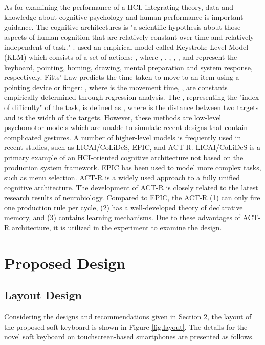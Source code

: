 \documentclass{singlecol-new}
\theoremstyle{TH}{
\newtheorem{lemma}{Lemma}
\newtheorem{theorem}[lemma]{Theorem}
\newtheorem{corrolary}[lemma]{Corrolary}
\newtheorem{conjecture}[lemma]{Conjecture}
\newtheorem{proposition}[lemma]{Proposition}
\newtheorem{claim}[lemma]{Claim}
\newtheorem{stheorem}[lemma]{Wrong Theorem}
\newtheorem{algorithm}{Algorithm}
}
\theoremstyle{THrm}{
\newtheorem{definition}{Definition}[section]
\newtheorem{question}{Question}[section]
\newtheorem{remark}{Remark}
\newtheorem{scheme}{Scheme}
}
\theoremstyle{THhit}{
\newtheorem{case}{Case}[section]
}
\begin{document}
As for examining the performance of a HCI, integrating theory, data and knowledge about cognitive psychology and human performance is important guidance. The cognitive architectures is "a scientific hypothesis about those aspects of human cognition that are relatively constant over time and relatively independent of task." \citep{gray1997introduction}. \citet{card1983psychology} used an empirical model called Keystroke-Level Model (KLM) which consists of a set of actions: , where , , , , , and  represent the keyboard, pointing, homing, drawing, mental preparation and system response, respectively. Fitts' Law \citep{fitts1954information} predicts the time taken to move to an item using a pointing device or finger: , where  is the movement time, ,  are constants empirically determined through regression analysis. The , representing the "index of difficulty" of the task, is defined as , where  is the distance between two targets and  is the width of the targets. However, these methods are low-level psychomotor models which are unable to simulate recent designs that contain complicated gestures. A number of higher-level models is frequently used in recent studies, such as LICAI/CoLiDeS, EPIC, and ACT-R. LICAI/CoLiDeS \citep{kitajima1997comprehension} is a primary example of an HCI-oriented cognitive architecture not based on the production system framework. EPIC \citep{kieras1997overview} has been used to model more complex tasks, such as menu selection. ACT-R \citep{anderson2004integrated}is a widely used approach to a fully unified cognitive architecture. The development of ACT-R is closely related to the latest research results of neurobiology. Compared to EPIC, the ACT-R (1) can only fire one production rule per cycle, (2) has a well-developed theory of declarative memory, and (3) contains learning mechanisms. Due to these advantages of ACT-R architecture, it is utilized in the experiment to examine the design.

\section{Proposed Design}

\subsection{Layout Design}

Considering the designs and recommendations given in Section 2, the layout of the proposed soft keyboard is shown in Figure \ref{fig.layout}. The details for the novel soft keyboard on touchscreen-based smartphones are presented as follows. \\
\end{document}
